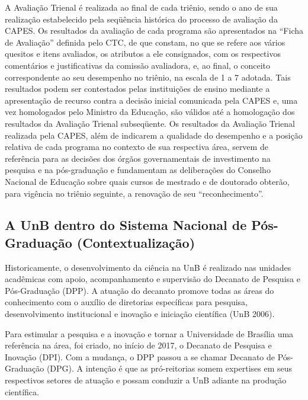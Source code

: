 \documentclass[]{article}
\begin{document}
A Avaliação Trienal é realizada ao final de cada triênio, sendo o ano de
sua realização estabelecido pela seqüência histórica do processo de
avaliação da CAPES. Os resultados da avaliação de cada programa são
apresentados na ``Ficha de Avaliação'' definida pelo CTC, de que
constam, no que se refere aos vários quesitos e itens avaliados, os
atributos a ele consignados, com os respectivos comentários e
justificativas da comissão avaliadora, e, ao final, o conceito
correspondente ao seu desempenho no triênio, na escala de 1 a 7 adotada.
Tais resultados podem ser contestados pelas instituições de ensino
mediante a apresentação de recurso contra a decisão inicial comunicada
pela CAPES e, uma vez homologados pelo Ministro da Educação, são válidos
até a homologação dos resultados da Avaliação Trienal subseqüente. Os
resultados da Avaliação Trienal realizada pela CAPES, além de indicarem
a qualidade do desempenho e a posição relativa de cada programa no
contexto de sua respectiva área, servem de referência para as decisões
dos órgãos governamentais de investimento na pesquisa e na pós-graduação
e fundamentam as deliberações do Conselho Nacional de Educação sobre
quais cursos de mestrado e de doutorado obterão, para vigência no
triênio seguinte, a renovação de seu ``reconhecimento''.

\hypertarget{a-unb-dentro-do-sistema-nacional-de-puxf3s-graduauxe7uxe3o-contextualizauxe7uxe3o}{%
\subsection{A UnB dentro do Sistema Nacional de Pós-Graduação
(Contextualização)}\label{a-unb-dentro-do-sistema-nacional-de-puxf3s-graduauxe7uxe3o-contextualizauxe7uxe3o}}

Historicamente, o desenvolvimento da ciência na UnB é realizado nas
unidades acadêmicas com apoio, acompanhamento e supervisão do Decanato
de Pesquisa e Pós-Graduação (DPP). A atuação do decanato promove todas
as áreas do conhecimento com o auxílio de diretorias específicas para
pesquisa, desenvolvimento institucional e inovação e iniciação
científica (UnB 2006).

Para estimular a pesquisa e a inovação e tornar a Universidade de
Brasília uma referência na área, foi criado, no início de 2017, o
Decanato de Pesquisa e Inovação (DPI). Com a mudança, o DPP passou a se
chamar Decanato de Pós-Graduação (DPG). A intenção é que as
pró-reitorias somem expertises em seus respectivos setores de atuação e
possam conduzir a UnB adiante na produção científica.
\end{document}
